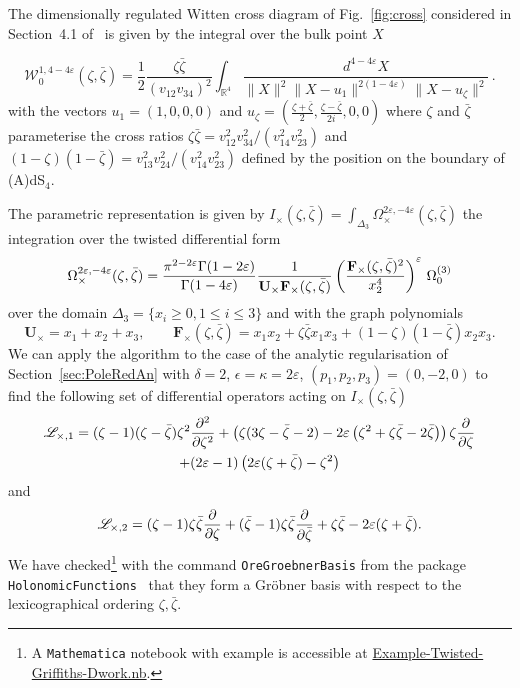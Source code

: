 \documentclass[a4paper,12pt]{article}
\numberwithin{equation}{section}
\numberwithin{figure}{section}
\begin{document}
The dimensionally regulated Witten cross diagram of Fig.~\ref{fig:cross} considered in
Section~4.1 of~\cite{Heckelbacher:2022fbx} is given by the integral
over the bulk point $X$

\begin{equation}
       \mathcal{ W}_0^{1,4-4\varepsilon}(\zeta,\bar\zeta)=\frac12\frac{\zeta\bar\zeta}{(v_{12}v_{34})^2}\int_{\mathbb{R}^4}\frac{d^{4-4\varepsilon}X}{\|X\|^2\|X-u_1\|^{2(1-4\varepsilon)}\|X-u_{\zeta}\|^2}\,.
\end{equation}
with the vectors  $u_1=(1,0,0,0)$ and 
$u_{\zeta}=\left(\frac{\zeta+\bar\zeta}{2},\frac{\zeta-\bar\zeta}{2i},0,0\right)$ where $\zeta$  and $\bar\zeta$ parameterise the cross ratios $\zeta\bar\zeta=v_{12}^2v_{34}^2/(v_{14}^2v_{23}^2)$ and
  $(1-\zeta)(1-\bar\zeta)=v_{13}^2v_{24}^2 /(v_{14}^2 v_{23}^2)$
  defined by the position on the boundary of (A)dS$_4$.

The parametric representation is given by
$
  I_\times(\zeta,\bar\zeta)= \int_{\Delta_3}   \Omega_\times^{2\varepsilon,-4\varepsilon}(\zeta,\bar\zeta)
$ the integration over the twisted differential form
\begin{equation}
  \Omega_\times^{2\varepsilon,-4\varepsilon}(\zeta,\bar\zeta)={\pi^{2-2\varepsilon}\Gamma(1-2\varepsilon)\over\Gamma(1-4\varepsilon)} {1\over \textbf{U}_\times
    \textbf{F}_\times (\zeta,\bar\zeta)} \left(
    \textbf{F}_\times (\zeta,\bar\zeta)^{2}\over  x_2^{4}\right)^\varepsilon  \, \Omega_0^{(3)}
\end{equation}
over the domain $\Delta_3=\{x_i\geq0, 1\leq i\leq 3\}$ and with the graph polynomials
\begin{equation}
  \textbf{U}_\times= x_1+x_2+x_3,  \qquad \textbf{F}_\times (\zeta,\bar\zeta)= x_1x_2+
  \zeta\bar\zeta x_1x_3+ (1-\zeta)(1-\bar\zeta)x_2x_3  .
\end{equation}
We can apply the algorithm to the case of the analytic regularisation
of Section~\ref{sec:PoleRedAn} 
with $\delta=2$, $\epsilon=\kappa=2\varepsilon$, $(p_1,p_2,p_3)=(0,-2,0)$
to find the following set of  differential operators
acting on $I_\times(\zeta,\bar\zeta)$
\begin{multline}
  \mathscr{L}_{\times,1}= (\zeta -1) (\zeta -\bar\zeta) \zeta ^2{\partial^2\over\partial\zeta^2}  +
   \left(\zeta (3 \zeta -\bar\zeta-2)-2\varepsilon  \left(\zeta ^2+\zeta 
   \bar\zeta-2 \bar\zeta\right) \right) \zeta {\partial\over\partial\zeta}\cr+(2 \varepsilon -1) \left(2 \varepsilon  (\zeta +\bar\zeta)-\zeta ^2\right)
\end{multline}
and
\begin{equation}
  \mathscr{L}_{\times,2}= (\zeta -1)\zeta\bar\zeta{\partial\over\partial\zeta}  +
   (\bar\zeta -1)\zeta\bar\zeta{\partial\over\partial\bar\zeta}+\zeta\bar\zeta-2\varepsilon(\zeta+\bar\zeta).
 \end{equation}
 We have checked\footnote{A {\tt Mathematica} notebook with  example is accessible at \href{Example-Twisted-Griffiths-Dwork.nb}{Example-Twisted-Griffiths-Dwork.nb}.}  with
  the command {\tt OreGroebnerBasis} from the package {\tt
    HolonomicFunctions}~\cite{Koutchan} that
they form a Gr\"obner basis with respect to the lexicographical
ordering $\zeta,\bar\zeta$.
\end{document}

